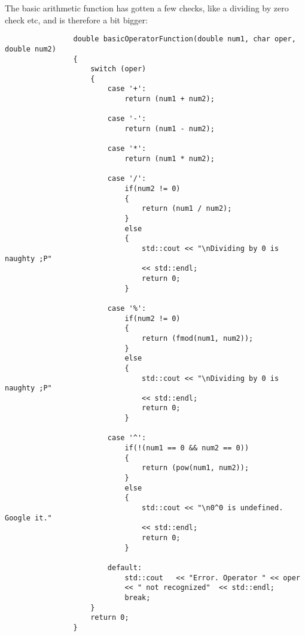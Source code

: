 \documentclass{article}
\begin{document}
			The basic arithmetic function has gotten a few checks, like a dividing by zero check etc, and is therefore a bit bigger:
			\begin{lstlisting}
				double basicOperatorFunction(double num1, char oper, double num2)
				{
					switch (oper)
					{
						case '+':
							return (num1 + num2);
						
						case '-':
							return (num1 - num2);
						
						case '*':
							return (num1 * num2);
						
						case '/':
							if(num2 != 0)
							{
								return (num1 / num2);
							}
							else
							{
								std::cout << "\nDividing by 0 is naughty ;P"
								<< std::endl;
								return 0;
							}
						
						case '%':
							if(num2 != 0)
							{
								return (fmod(num1, num2));
							}
							else
							{
								std::cout << "\nDividing by 0 is naughty ;P"
								<< std::endl;
								return 0;
							}
						
						case '^':
							if(!(num1 == 0 && num2 == 0))
							{
								return (pow(num1, num2));
							}
							else
							{
								std::cout << "\n0^0 is undefined. Google it."
								<< std::endl;
								return 0;
							}
						
						default:
							std::cout   << "Error. Operator " << oper
							<< " not recognized"  << std::endl;
							break;
					}
					return 0;
				}
			\end{lstlisting}
			
\end{document}
